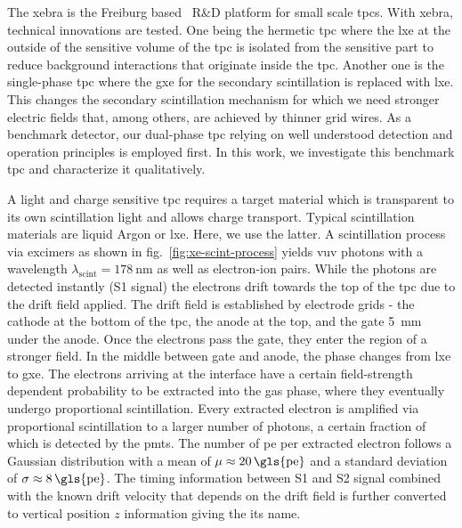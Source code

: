 The \gls{xebra} is the Freiburg based \darwin~R\&D platform for small scale \glspl{tpc}.
With \gls{xebra}, technical innovations are tested.
One being the hermetic \gls{tpc} where the \gls{lxe} at the outside of the sensitive volume of the \gls{tpc} is isolated from the sensitive part to reduce background interactions that originate inside the \gls{tpc}.
Another one is the single-phase \gls{tpc} where the \gls{gxe} for the secondary scintillation is replaced with \gls{lxe}.
This changes the secondary scintillation mechanism for which we need stronger electric fields that, among others, are achieved by thinner grid wires.
As a benchmark detector, our dual-phase \gls{tpc} relying on well understood detection and operation principles is employed first.
In this work, we investigate this benchmark \gls{tpc} and characterize it qualitatively.

A light and charge sensitive \gls{tpc} requires a target material which is transparent to its own scintillation light and allows charge transport.
Typical scintillation materials are liquid Argon or \gls{lxe}.
Here, we use the latter.
A scintillation process via excimers as shown in fig.~\ref{fig:xe-scint-process} yields \gls{vuv} photons with a wavelength $ \lambda_\mathrm{scint} = \SI{178}{\nano\meter} $ as well as electron-ion pairs.  %
While the photons are detected instantly (S1 signal) the electrons drift towards the top of the \gls{tpc} due to the drift field applied.
The drift field is established by electrode grids - the cathode at the bottom of the \gls{tpc}, the anode at the top, and the gate \SI{5}{\milli\m} under the anode.
Once the electrons pass the gate, they enter the region of a stronger field.
In the middle between gate and anode, the phase changes from \gls{lxe} to \gls{gxe}.
The electrons arriving at the interface have a certain field-strength dependent probability to be extracted into the gas phase, where they eventually undergo proportional scintillation.  %
Every extracted electron is amplified via proportional scintillation to a larger number of photons, a certain fraction of which is detected by the \glspl{pmt}.
The number of \gls{pe} per extracted electron follows a Gaussian distribution with a mean of $ \mu \approx \SI{20}{\gls{pe}} $ and a standard deviation of $ \sigma \approx \SI{8}{\gls{pe}} $.
The timing information between S1 and S2 signal combined with the known drift velocity that depends on the drift field is further converted to vertical position $ z $ information giving the \emph{} its name.

